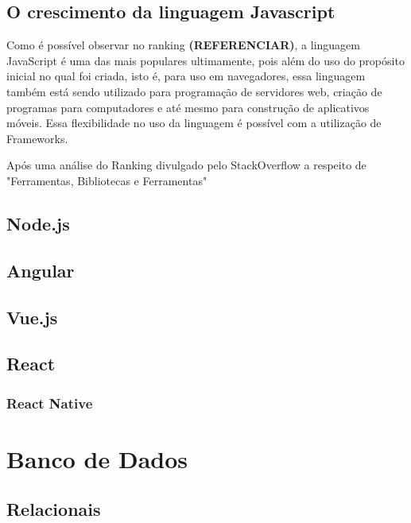 \subsection{O crescimento da linguagem Javascript}

Como é possível observar no ranking \textbf{(REFERENCIAR)}, a linguagem JavaScript é uma das mais populares ultimamente, pois além do uso do propósito inicial no qual foi criada, isto é, para uso em navegadores, essa linguagem também está sendo utilizado para programação de servidores web, criação de programas para computadores e até mesmo para construção de aplicativos móveis. Essa flexibilidade no uso da linguagem é possível com a utilização de Frameworks.


Após uma análise do Ranking divulgado pelo StackOverflow a respeito de "Ferramentas, Bibliotecas e Ferramentas"

\subsection{Node.js}

\subsection{Angular}

\subsection{Vue.js}

\subsection{React}

\subsubsection{React Native} \label{React Native}

\section{Banco de Dados}

\subsection{Relacionais}

